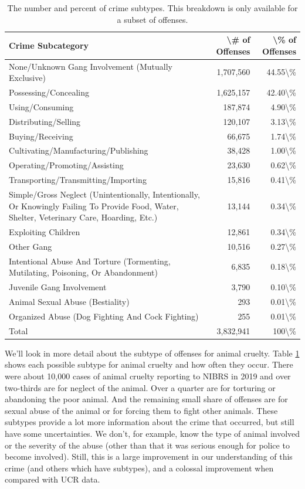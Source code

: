 \documentclass[
  12pt,
  openany]{book}
\begin{document}
\begin{longtable}[t]{lrr}
\caption{\label{tab:offenseCrimeSubcategories}The number and percent of crime subtypes. This breakdown is only available for a subset of offenses.}\\
\toprule
Crime Subcategory & \textbackslash{}\# of Offenses & \textbackslash{}\% of Offenses\\
\midrule
None/Unknown Gang Involvement (Mutually Exclusive) & 1,707,560 & 44.55\textbackslash{}\%\\
Possessing/Concealing & 1,625,157 & 42.40\textbackslash{}\%\\
Using/Consuming & 187,874 & 4.90\textbackslash{}\%\\
Distributing/Selling & 120,107 & 3.13\textbackslash{}\%\\
Buying/Receiving & 66,675 & 1.74\textbackslash{}\%\\
\addlinespace
Cultivating/Manufacturing/Publishing & 38,428 & 1.00\textbackslash{}\%\\
Operating/Promoting/Assisting & 23,630 & 0.62\textbackslash{}\%\\
Transporting/Transmitting/Importing & 15,816 & 0.41\textbackslash{}\%\\
Simple/Gross Neglect (Unintentionally, Intentionally, Or Knowingly Failing To Provide Food, Water, Shelter, Veterinary Care, Hoarding, Etc.) & 13,144 & 0.34\textbackslash{}\%\\
Exploiting Children & 12,861 & 0.34\textbackslash{}\%\\
\addlinespace
Other Gang & 10,516 & 0.27\textbackslash{}\%\\
Intentional Abuse And Torture (Tormenting, Mutilating, Poisoning, Or Abandonment) & 6,835 & 0.18\textbackslash{}\%\\
Juvenile Gang Involvement & 3,790 & 0.10\textbackslash{}\%\\
Animal Sexual Abuse (Bestiality) & 293 & 0.01\textbackslash{}\%\\
Organized Abuse (Dog Fighting And Cock Fighting) & 255 & 0.01\textbackslash{}\%\\
\addlinespace
Total & 3,832,941 & 100\textbackslash{}\%\\
\bottomrule
\end{longtable}

We'll look in more detail about the subtype of offenses for animal cruelty. Table \ref{tab:offenseCrimeSubcategories} shows each possible subtype for animal cruelty and how often they occur. There were about 10,000 cases of animal cruelty reporting to NIBRS in 2019 and over two-thirds are for neglect of the animal. Over a quarter are for torturing or abandoning the poor animal. And the remaining small share of offenses are for sexual abuse of the animal or for forcing them to fight other animals. These subtypes provide a lot more information about the crime that occurred, but still have some uncertainties. We don't, for example, know the type of animal involved or the severity of the abuse (other than that it was serious enough for police to become involved). Still, this is a large improvement in our understanding of this crime (and others which have subtypes), and a colossal improvement when compared with UCR data.
\end{document}
